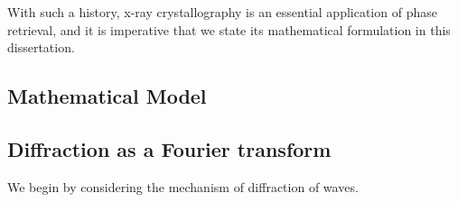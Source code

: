 With such a history, x-ray crystallography is an essential application of phase retrieval, and it is imperative that we state its mathematical formulation in this dissertation.

\subsection{Mathematical Model}

\subsection{Diffraction as a Fourier transform}
We begin by considering the mechanism of diffraction of waves.  

